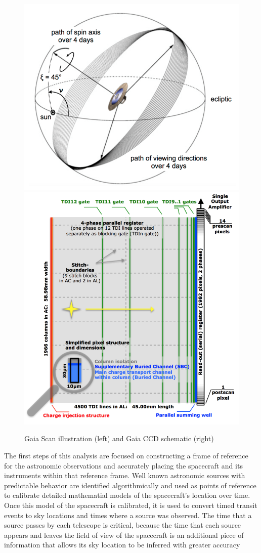 \documentclass[twocolumn]{aastex631}
\begin{document}
\begin{figure}
	\includegraphics[width=0.49\columnwidth]{scanninglaw.png} \includegraphics[width=0.49\columnwidth]{gaiaccd.png}
	\caption{Gaia Scan illustration (left) and Gaia CCD schematic (right) \citep{collaborationGaia2016}}
	 \label{fig:scanninglaw} \label{fig:ccd}
\end{figure}

The first steps of this analysis are focused on constructing a frame of reference for the astronomic observations and accurately placing the spacecraft and its instruments within that reference frame. Well known astronomic sources with predictable behavior are identified algorithmically and used as points of reference to calibrate detailed mathematial models of the spacecraft's location over time. Once this model of the spacecraft is calibrated, it is used to convert timed transit events to sky locations and times where a source was observed. The time that a source passes by each telescope is critical, because the time that each source appears and leaves the field of view of the spacecraft is an additional piece of information that allows its sky location to be inferred with greater accuracy
\end{document}
